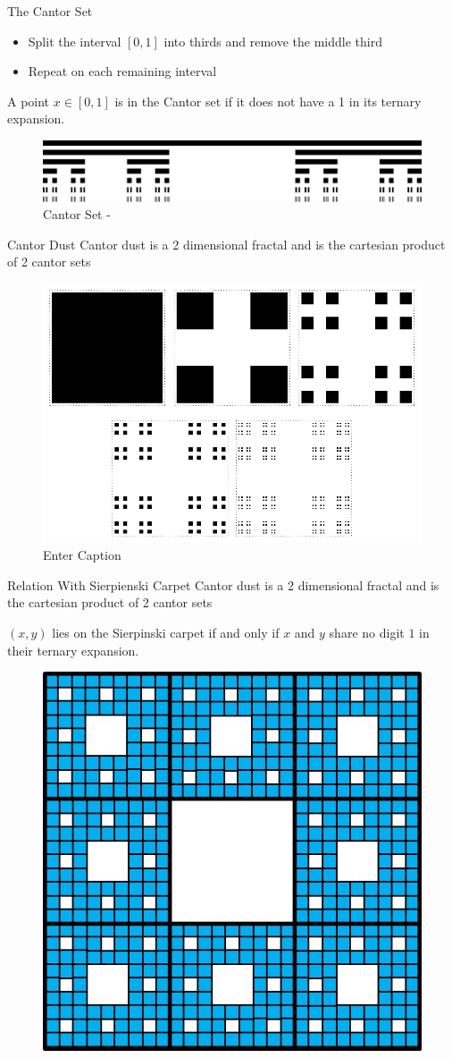 \begin{frame}{The Cantor Set}
	\begin{itemize}
		\item Split the interval $[0,1]$ into thirds and remove the middle third
		\item Repeat on each remaining interval
	\end{itemize}
	\begin{remark}
		A point $x \in [0,1]$ is in the Cantor set if it does not have a 1 in its ternary expansion.
	\end{remark}
	\begin{figure}
		\centering
		\includegraphics[width=0.5\linewidth]{Cantor_set_in_seven_iterations.svg.png}
		\caption{Cantor Set - \cite{cantor}}
		\label{fig:enter-label}
	\end{figure}
\end{frame}

\begin{frame}{Cantor Dust}
	Cantor dust is a 2 dimensional fractal and is the cartesian product of 2 cantor sets
	\begin{figure}
		\centering
		\includegraphics[width=0.5\linewidth]{cantordust.png}
		\caption{Enter Caption}
		\label{fig:enter-label}
	\end{figure}
\end{frame}

\begin{frame}{Relation With Sierpienski Carpet}
	Cantor dust is a 2 dimensional fractal and is the cartesian product of 2 cantor sets
	\begin{lemma}
		$(x,y)$ lies on the Sierpinski carpet if and only if $x$ and $y$ share no digit $1$ in their ternary expansion.
	\end{lemma}
	\begin{figure}
		\centering
		\includegraphics[width=0.2\linewidth]{Carpet.jpg}
		\caption{\cite{sierpinski2016}}
		\label{fig:enter-label}
	\end{figure}
\end{frame}

